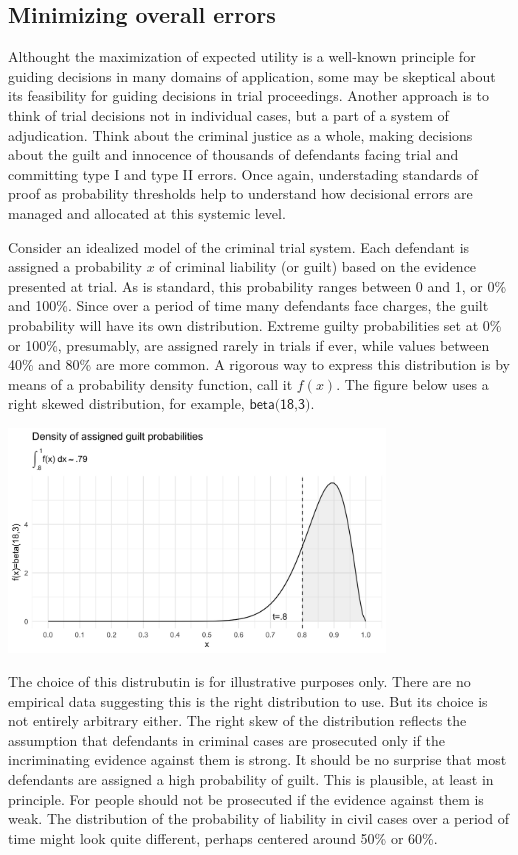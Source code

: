 \documentclass[10pt,dvipsnames,enabledeprecatedfontcommands]{scrartcl}
\begin{document}
\subsection{Minimizing overall errors}

Althought the maximization of expected utility is a well-known principle
for guiding decisions in many domains of application, some may be
skeptical about its feasibility for guiding decisions in trial
proceedings. Another approach is to think of trial decisions not in
individual cases, but a part of a system of adjudication. Think about
the criminal justice as a whole, making decisions about the guilt and
innocence of thousands of defendants facing trial and committing type I
and type II errors. Once again, understading standards of proof as
probability thresholds help to understand how decisional errors are
managed and allocated at this systemic level.

Consider an idealized model of the criminal trial system. Each defendant
is assigned a probability \(x\) of criminal liability (or guilt) based
on the evidence presented at trial. As is standard, this probability
ranges between 0 and 1, or 0\% and 100\%. Since over a period of time
many defendants face charges, the guilt probability will have its own
distribution. Extreme guilty probabilities set at 0\% or 100\%,
presumably, are assigned rarely in trials if ever, while values between
40\% and 80\% are more common. A rigorous way to express this
distribution is by means of a probability density function, call it
\(f(x)\). The figure below uses a right skewed distribution, for
example, \(\textsf{beta(18,3)}\).

\begin{center}
    \includegraphics[width=10cm]{beta(18,3)2.png}
\end{center}

\noindent

The choice of this distrubutin is for illustrative purposes only. There
are no empirical data suggesting this is the right distribution to use.
But its choice is not entirely arbitrary either. The right skew of the
distribution reflects the assumption that defendants in criminal cases
are prosecuted only if the incriminating evidence against them is
strong. It should be no surprise that most defendants are assigned a
high probability of guilt. This is plausible, at least in principle. For
people should not be prosecuted if the evidence against them is weak.
The distribution of the probability of liability in civil cases over a
period of time might look quite different, perhaps centered around 50\%
or 60\%.
\end{document}
